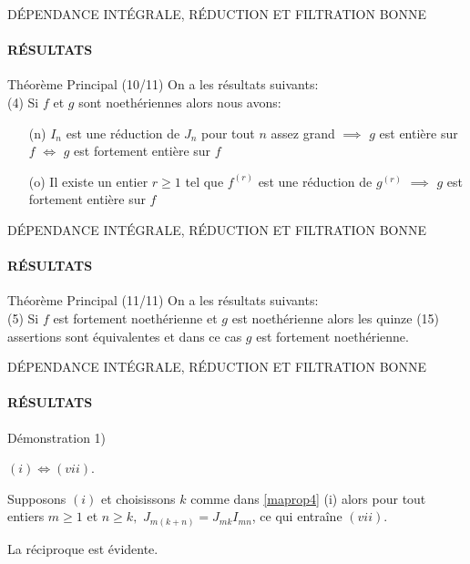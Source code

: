 \documentclass[11pt,a4paper]{beamer}
\begin{document}
\begin{frame}{DÉPENDANCE INTÉGRALE, RÉDUCTION ET FILTRATION BONNE}
	\framesubtitle{RÉSULTATS}
	\begin{block}{Théorème Principal (10/11)}
		On a les résultats suivants:\\
		(4) Si $f$ et $g$ sont noethériennes alors nous avons:
		\begin{enumerate}
			\item[(n)] $I_{n}$ est une réduction de $J_{n}$ pour tout $n$ assez grand $\implies$ $g$ est entière sur $f$ $\Longleftrightarrow$ $g$ est fortement entière sur $f$
			\item[(o)] Il existe un entier $r\geq 1$ tel que $f^{(r)}$ est une réduction de $g^{(r)}$ $\implies$ $g$ est fortement entière sur $f$
		\end{enumerate}
	\end{block}
\end{frame}

\begin{frame}{DÉPENDANCE INTÉGRALE, RÉDUCTION ET FILTRATION BONNE}
	\framesubtitle{RÉSULTATS}
	\begin{block}{Théorème Principal (11/11)}
		On a les résultats suivants:\\
		(5) Si $f$ est fortement noethérienne et $g$ est noethérienne alors les quinze (15) assertions sont équivalentes et dans ce cas $g$ est fortement noethérienne.
	\end{block}
\end{frame}

\begin{frame}{DÉPENDANCE INTÉGRALE, RÉDUCTION ET FILTRATION BONNE}
	\framesubtitle{RÉSULTATS}
	\begin{block}{Démonstration}
			1)
		
		$(i)\Longleftrightarrow (vii).$
		
		Supposons $(i)$ et choisissons $k$ comme dans \ref{maprop4} (i) alors pour tout
		entiers $m\geq 1$ et $n\geq k,$ $J_{m(k+n)}=J_{mk}I_{mn}$, ce qui entraîne $(vii).$
		
		La réciproque est évidente.
		
	\end{block}
\end{frame}
\end{document}
